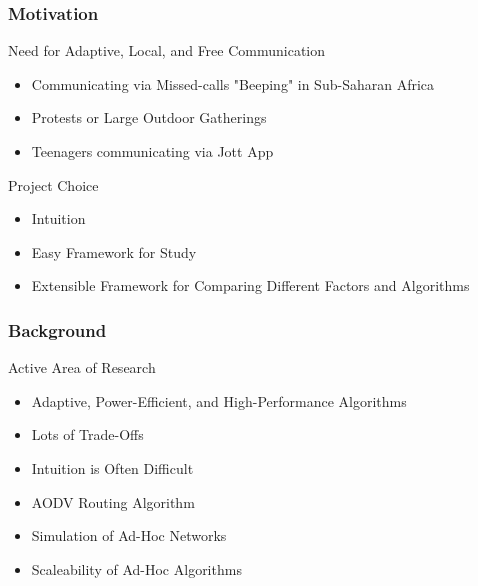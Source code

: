 
\subtitle{\class}

\newcommand{\listheading}[1]{%
    {\Large #1}
}


\begin{frame}
    \titlepage
\end{frame}

\begin{frame}
    \frametitle{Motivation}
    \listheading{Need for Adaptive, Local, and Free Communication}
    \begin{itemize}
        \item Communicating via Missed-calls "Beeping" in Sub-Saharan Africa \cite{beeping}
        \item Protests or Large Outdoor Gatherings
        \item Teenagers communicating via Jott App \cite{jott-techcrunch,jott-forbes}\\[0.5cm]
    \end{itemize}
    
    \listheading{Project Choice}
    \begin{itemize}
        \item Intuition
        \item Easy Framework for Study
        \item Extensible Framework for Comparing Different Factors and Algorithms
    \end{itemize}

\end{frame}

\begin{frame}
    \frametitle{Background}
    \listheading{Active Area of Research}
    \begin{itemize}
        \item Adaptive, Power-Efficient, and High-Performance Algorithms
        \item Lots of Trade-Offs
        \item Intuition is Often Difficult
        \item AODV Routing Algorithm \cite{perkins99,royer00}
        \item Simulation of Ad-Hoc Networks \cite{morshed08}
        \item Scaleability of Ad-Hoc Algorithms \cite{lee01}
    \end{itemize}

\end{frame}

